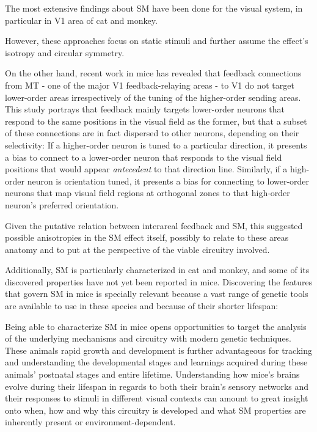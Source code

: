 The most extensive findings about SM have been done for the visual system, in particular in V1 area of cat and monkey.

However, these approaches focus on static stimuli and further assume the effect's isotropy and circular symmetry. 

On the other hand, recent work in mice has revealed that feedback connections from MT - one of the major V1 feedback-relaying areas - to V1 do not target lower-order areas irrespectively of the tuning of the higher-order sending areas. This study portrays that feedback mainly targets lower-order neurons that respond to the same positions in the visual field as the former, but that a subset of these connections are in fact dispersed to other neurons, depending on their selectivity: If a higher-order neuron is tuned to a particular direction, it presents a bias to connect to a lower-order neuron that responds to the visual field positions that would appear \textit{antecedent} to that direction line. Similarly, if a high-order neuron is orientation tuned, it presents a bias for connecting to lower-order neurons that map visual field regions at orthogonal zones to that high-order neuron's preferred orientation. 

Given the putative relation between interareal feedback and SM, this suggested possible anisotropies in the SM effect itself, possibly to relate to these areas anatomy and to put at the perspective of the viable circuitry involved.

Additionally, SM is particularly characterized in cat and monkey, and some of its discovered properties have not yet been reported in mice. Discovering the features that govern SM in mice is specially relevant because a vast range of genetic tools are available to use in these species and because of their shorter lifespan:

Being able to characterize SM in mice opens opportunities to target the analysis of the underlying mechanisms and circuitry with modern genetic techniques. These animals rapid growth and development is further advantageous for tracking and understanding the developmental stages and learnings acquired during these animals' postnatal stages and entire lifetime. Understanding how mice's brains evolve during their lifespan in regards to both their brain's sensory networks and their responses to stimuli in different visual contexts can amount to great insight onto when, how and why this circuitry is developed and what SM properties are inherently present or environment-dependent.

